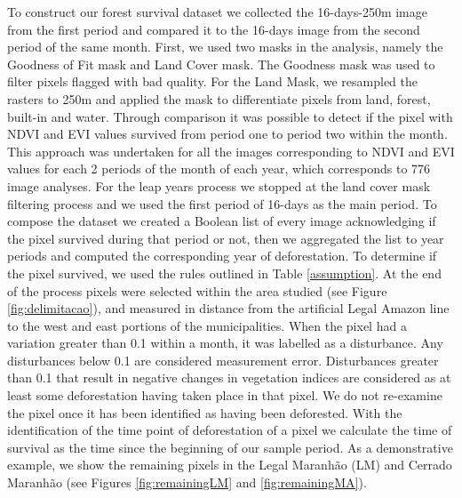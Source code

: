 To construct our forest survival dataset we collected the 16-days-250m image from the first period and compared it to the 16-days image from the second period of the same month. First, we used two masks in the analysis, namely the Goodness of Fit mask and Land Cover mask. The Goodness mask was used to filter pixels flagged with bad quality. For the Land Mask, we resampled the rasters to 250m and applied the mask to differentiate pixels from land, forest, built-in and water. Through comparison it was possible to detect if the pixel with NDVI and EVI values survived from period one to period two within the month. This approach was undertaken for all the images corresponding to NDVI and EVI values for each 2 periods of the month of each year, which corresponds to 776 image analyses. For the leap years process we stopped at the land cover mask filtering process and we used the first period of 16-days as the main period. To compose the dataset we created a Boolean list of every image acknowledging if the pixel survived during that period or not, then we aggregated the list to year periods and computed the corresponding year of deforestation. To determine if the pixel survived, we used the rules outlined in Table \ref{assumption}. At the end of the process pixels were selected within the area studied (see Figure \ref{fig:delimitacao}), and measured in distance from the artificial Legal Amazon line to the west and east portions of the municipalities. When the pixel had a variation greater than 0.1 within a month, it was labelled as a disturbance. Any disturbances below 0.1 are considered measurement error.  Disturbances greater than 0.1 that result in negative changes in vegetation indices are considered as at least some deforestation having taken place in that pixel.  We do not re-examine the pixel once it has been identified as having been deforested.  With the identification of the time point of deforestation of a pixel we calculate the time of survival as the time since the beginning of our sample period. As a demonstrative example, we show the remaining pixels in the Legal Maranhão (LM) and Cerrado Maranhão (see Figures \ref{fig:remainingLM} and \ref{fig:remainingMA}).  


